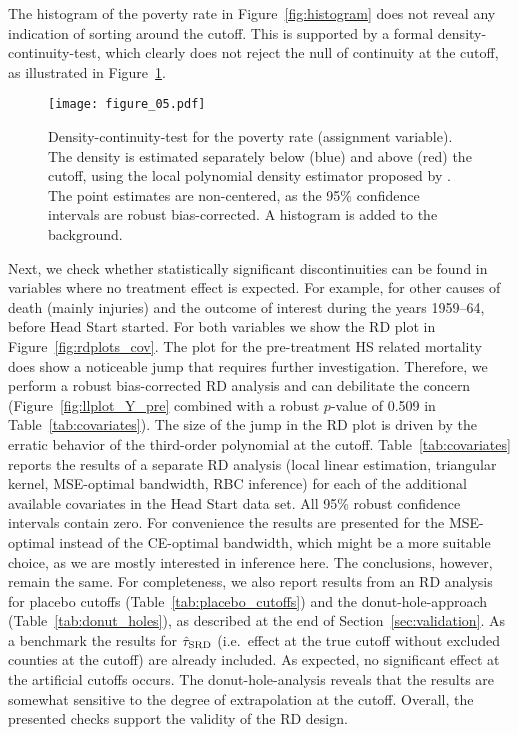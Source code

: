 The histogram of the poverty rate in Figure~\ref{fig:histogram} does not reveal any indication of sorting around the cutoff.
This is supported by a formal density-continuity-test, which clearly does not reject the null of continuity at the cutoff,
as illustrated in Figure~\ref{fig:rddensityplot}.
\begin{figure}
	\centering
	\texttt{[image: figure\_05.pdf]}
	\caption{Density-continuity-test for the poverty rate (assignment variable).
			 The density is estimated separately below (blue) and above (red) the cutoff,
		 	 using the local polynomial density estimator proposed by \textcite{Cattaneo_2020}.
	 	 	 The point estimates are non-centered, as the 95\% confidence intervals are robust bias-corrected.
 	 	 	 A histogram is added to the background.}
	\label{fig:rddensityplot}
\end{figure}
Next, we check whether statistically significant discontinuities can be found in variables where no treatment effect is expected.
For example, for other causes of death (mainly injuries) and the outcome of interest during the years 1959--64, before Head Start started.
For both variables we show the RD plot in Figure~\ref{fig:rdplots_cov}.
The plot for the pre-treatment HS related mortality does show a noticeable jump that requires further investigation.
Therefore, we perform a robust bias-corrected RD analysis and can debilitate the concern
(Figure~\ref{fig:llplot_Y_pre} combined with a robust $p$-value of 0.509 in Table~\ref{tab:covariates}).
The size of the jump in the RD plot is driven by the erratic behavior of the third-order polynomial at the cutoff.
Table~\ref{tab:covariates} reports the results of a separate RD analysis
(local linear estimation, triangular kernel, MSE-optimal bandwidth, RBC inference)
for each of the additional available covariates in the Head Start data set.
All 95\% robust confidence intervals contain zero.
For convenience the results are presented for the MSE-optimal instead of the CE-optimal bandwidth,
which might be a more suitable choice,
as we are mostly interested in inference here.
The conclusions, however, remain the same.
For completeness, we also report results from an RD analysis for placebo cutoffs (Table~\ref{tab:placebo_cutoffs})
and the donut-hole-approach (Table~\ref{tab:donut_holes}), as described at the end of Section~\ref{sec:validation}.
As a benchmark the results for $\hat{\tau}_{\textup{SRD}}$ (i.e.\ effect at the true cutoff without excluded counties at the cutoff) are already included.
As expected, no significant effect at the artificial cutoffs occurs.
The donut-hole-analysis reveals that the results are somewhat sensitive to the degree of extrapolation at the cutoff.
Overall, the presented checks support the validity of the RD design. 

